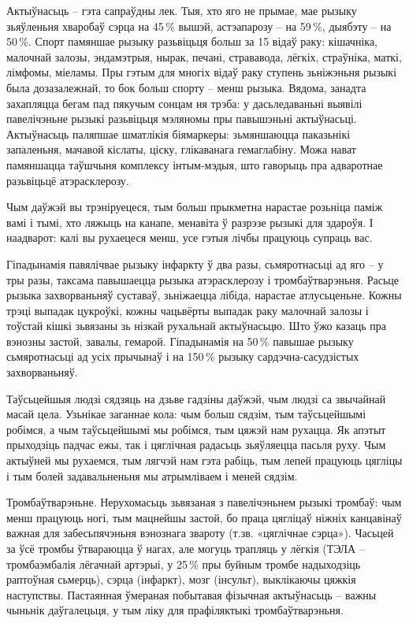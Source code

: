 Актыўнасьць – гэта сапраўдны лек. Тыя, хто яго не прымае, мае рызыку зьяўленьня хваробаў сэрца на 45\,\% вышэй, астэапарозу – на 59\,\%, дыябэту – на 50\,\%. Спорт памяншае рызыку разьвіцьця больш за 15 відаў раку: кішачніка, малочнай залозы, эндамэтрыя, нырак, печані, стрававода, лёгкіх, страўніка, маткі, лімфомы, міеламы. Пры гэтым для многіх відаў раку ступень зьніжэньня рызыкі была дозазалежнай, то бок больш спорту – менш рызыка. Вядома, занадта захапляцца бегам пад пякучым сонцам ня трэба: у дасьледаваньні выявілі павелічэньне рызыкі разьвіцьця мэляномы пры павышэньні актыўнасьці. Актыўнасьць паляпшае шматлікія біямаркеры: зьмяншаюцца паказьнікі запаленьня, мачавой кіслаты, ціску, глікаванага гемаглабіну. Можа нават памяншацца таўшчыня комплексу інтым-мэдыя, што гаворыць пра адваротнае разьвіцьцё атэрасклерозу.

Чым даўжэй вы трэніруецеся, тым больш прыкметна нарастае розьніца паміж вамі і тымі, хто ляжыць на канапе, менавіта ў разрэзе рызыкі для здароўя. І наадварот: калі вы рухаецеся менш, усе гэтыя лічбы працуюць супраць вас.

Гіпадынамія павялічвае рызыку інфаркту ў два разы, сьмяротнасьці ад яго – у тры разы, таксама павышаецца рызыка атэрасклерозу і тромбаўтварэньня. Расьце рызыка захворваньняў суставаў, зьніжаецца лібіда, нарастае атлусьценьне. Кожны трэці выпадак цукроўкі, кожны чацьвёрты выпадак раку малочнай залозы і тоўстай кішкі зьвязаны зь нізкай рухальнай актыўнасьцю. Што ўжо казаць пра вэнозны застой, завалы, гемарой. Гіпадынамія на 50\,\% павышае рызыку сьмяротнасьці ад усіх прычынаў і на 150\,\% рызыку сардэчна-сасудзістых захворваньняў.

Таўсьцейшыя людзі сядзяць на дзьве гадзіны даўжэй, чым людзі са звычайнай масай цела. Узьнікае заганнае кола: чым больш сядзім, тым таўсьцейшымі робімся, а чым таўсьцейшымі мы робімся, тым цяжэй нам рухацца. Як апэтыт прыходзіць падчас ежы, так і цяглічная радасьць зьяўляецца пасьля руху. Чым актыўней мы рухаемся, тым лягчэй нам гэта рабіць, тым лепей працуюць цягліцы і тым болей задавальненьня мы атрымліваем і меней сядзім.

Тромбаўтварэньне. Нерухомасьць зьвязаная з павелічэньнем рызыкі тромбаў: чым менш працуюць ногі, тым мацнейшы застой, бо праца цягліцаў ніжніх канцавінаў важная для забесьпячэньня вэнознага звароту (т.зв. «цяглічнае сэрца»). Часьцей за ўсё тромбы ўтвараюцца ў нагах, але могуць трапляць у лёгкія (ТЭЛА – тромбаэмбалія лёгачнай артэрыі, у 25\,\% пры буйным тромбе надыходзіць раптоўная сьмерць), сэрца (інфаркт), мозг (інсульт), выклікаючы цяжкія наступствы. Пастаянная ўмераная побытавая фізычная актыўнасьць – важны чыньнік даўгалецьця, у тым ліку для прафіляктыкі тромбаўтварэньня.

